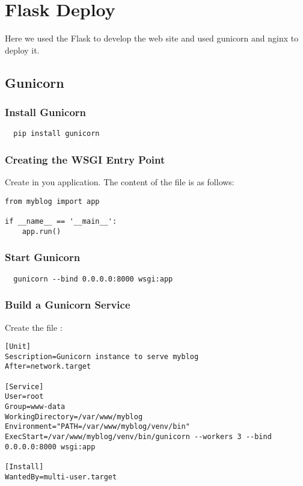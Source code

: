 
\chapter{Flask Deploy}
\label{cha:deploy}

Here we used the Flask to develop the web site and used gunicorn and nginx to deploy it.



\section{Gunicorn}
\label{sec:gunicorn}

\subsection{Install Gunicorn}
\label{sec:install-gunicorn}

\begin{lstlisting}
  pip install gunicorn
\end{lstlisting}


\subsection{Creating the WSGI Entry Point}
\label{sec:application}

Create  in you application.
The content of the file is as follows:

\begin{lstlisting}
from myblog import app

if __name__ == '__main__':
    app.run()
\end{lstlisting}



\subsection{Start Gunicorn}
\label{sec:start-gunicorn}

\begin{lstlisting}
  gunicorn --bind 0.0.0.0:8000 wsgi:app
\end{lstlisting}


\subsection{Build a Gunicorn Service}
\label{sec:build-gunic-serv}

Create the file :
\begin{lstlisting}
[Unit]
Sescription=Gunicorn instance to serve myblog
After=network.target

[Service]
User=root
Group=www-data
WorkingDirectory=/var/www/myblog
Environment="PATH=/var/www/myblog/venv/bin"
ExecStart=/var/www/myblog/venv/bin/gunicorn --workers 3 --bind 0.0.0.0:8000 wsgi:app

[Install]
WantedBy=multi-user.target  
\end{lstlisting}

